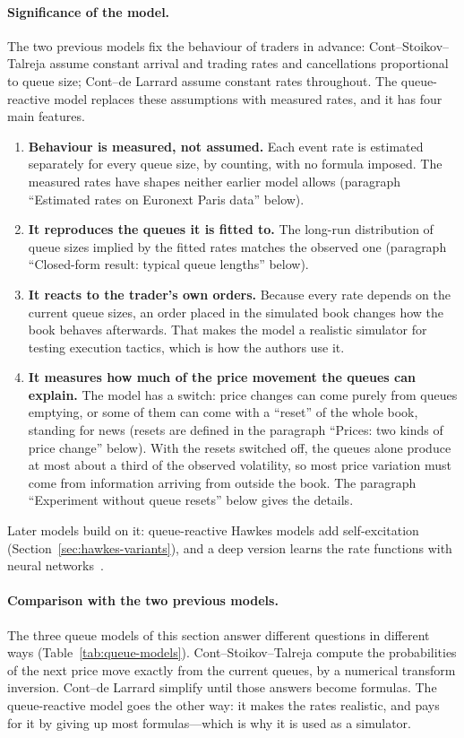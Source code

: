 \paragraph{Significance of the model.} The two previous models fix the behaviour of traders in advance:
Cont--Stoikov--Talreja assume constant arrival and trading rates and cancellations proportional to queue
size; Cont--de Larrard assume constant rates throughout. The queue-reactive model replaces these
assumptions with measured rates, and it has four main features.
\begin{enumerate}[leftmargin=1.8em,itemsep=2pt]
\item \textbf{Behaviour is measured, not assumed.} Each event rate is estimated separately for every
  queue size, by counting, with no formula imposed. The measured rates have shapes neither earlier model
  allows (paragraph ``Estimated rates on Euronext Paris data'' below).
\item \textbf{It reproduces the queues it is fitted to.} The long-run distribution of queue sizes implied
  by the fitted rates matches the observed one (paragraph ``Closed-form result: typical queue lengths''
  below).
\item \textbf{It reacts to the trader's own orders.} Because every rate depends on the current queue
  sizes, an order placed in the simulated book changes how the book behaves afterwards. That makes the model
  a realistic simulator for testing execution tactics, which is how the authors use it.
\item \textbf{It measures how much of the price movement the queues can explain.} The model has a
  switch: price changes can come purely from queues emptying, or some of them can come with a ``reset''
  of the whole book, standing for news (resets are defined in the paragraph ``Prices: two kinds of price
  change'' below). With the resets switched off, the queues alone produce at most
  about a third of the observed volatility, so most price variation must come from information arriving
  from outside the book. The paragraph ``Experiment without queue resets'' below gives the details.
\end{enumerate}
Later models build on it: queue-reactive Hawkes models add self-excitation
(Section~\ref{sec:hawkes-variants}), and a deep version learns the rate functions with neural
networks~\citep{deepqr}.

\paragraph{Comparison with the two previous models.} The three queue models of this section answer
different questions in different ways (Table~\ref{tab:queue-models}). Cont--Stoikov--Talreja compute the
probabilities of the next price move exactly from the current queues, by a numerical transform inversion.
Cont--de Larrard simplify until those answers become formulas. The queue-reactive model goes the other
way: it makes the rates realistic, and pays for it by giving up most formulas---which is why it is used as
a simulator.


